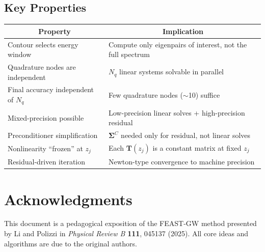 \documentclass[12pt,a4paper]{article}
\theoremstyle{definition}
\begin{document}
\subsection{Key Properties}

\begin{center}
\begin{tabular}{p{} p{}}
\toprule
\multicolumn{1}{c}{\textbf{Property}} & \multicolumn{1}{c}{\textbf{Implication}} \\
\midrule
Contour selects energy window & Compute only eigenpairs of interest, not the full spectrum \\
\addlinespace
Quadrature nodes are independent & $N_q$ linear systems solvable in parallel \\
\addlinespace
Final accuracy independent of $N_q$ & Few quadrature nodes ($\sim$10) suffice \\
\addlinespace
Mixed-precision possible & Low-precision linear solves + high-precision residual \\
\addlinespace
Preconditioner simplification & $\mathbf{\Sigma}^{C}$ needed only for residual, not linear solves \\
\addlinespace
Nonlinearity ``frozen'' at $z_j$ & Each $\mathbf{T}(z_j)$ is a constant matrix at fixed $z_j$ \\
\addlinespace
Residual-driven iteration & Newton-type convergence to machine precision \\
\bottomrule
\end{tabular}
\end{center}

\section*{Acknowledgments}
This document is a pedagogical exposition of the FEAST-GW method presented by Li and Polizzi in \textit{Physical Review B} \textbf{111}, 045137 (2025). All core ideas and algorithms are due to the original authors.
\end{document}
